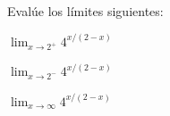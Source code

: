 \item Evalúe los límites siguientes:
\begin{enumerate}
    \begin{minipage}{0.3\textwidth}
    \item[(a)] $\displaystyle \lim_{x \to 2^+} 4^{x/(2-x)}$
    \end{minipage}%
    \begin{minipage}{0.3\textwidth}
    \item[(b)] $\displaystyle \lim_{x \to 2^-} 4^{x/(2-x)}$
    \end{minipage}%
    \begin{minipage}{0.3\textwidth}
    \item[(c)] $\displaystyle \lim_{x \to \infty} 4^{x/(2-x)}$
    \end{minipage}
\end{enumerate}
